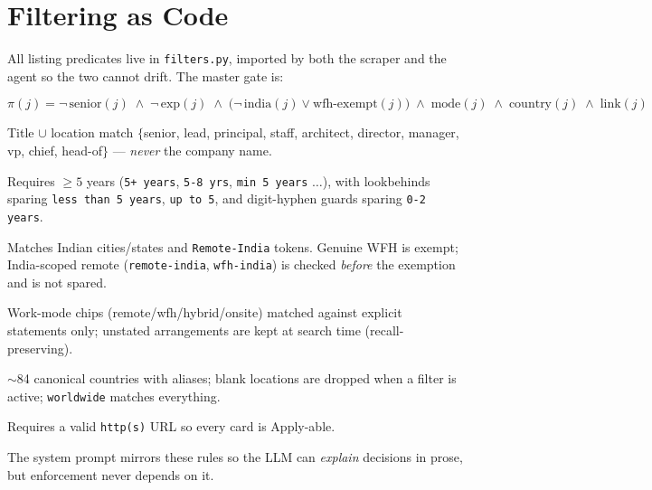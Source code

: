 \documentclass[11pt,a4paper]{article}
\newcommand{\file}[1]{\texttt{\small #1}}
\newcommand{\code}[1]{\texttt{#1}}
\begin{document}
\section{Filtering as Code}
\label{sec:filters}

All listing predicates live in \file{filters.py}, imported by both the
scraper and the agent so the two cannot drift. The master gate is:

\begin{equation}
\pi(j) = \neg\,\text{senior}(j) \;\wedge\;
         \neg\,\text{exp}(j) \;\wedge\;
         \bigl(\neg\,\text{india}(j) \vee \text{wfh-exempt}(j)\bigr)
         \;\wedge\;
         \text{mode}(j) \;\wedge\;
         \text{country}(j) \;\wedge\;
         \text{link}(j)
\end{equation}

\begin{description}[leftmargin=6.4em, style=nextline]
  \item[senior$(j)$] Title $\cup$ location match
        $\{$senior, lead, principal, staff, architect, director, manager,
        vp, chief, head-of$\}$ --- \emph{never} the company name.
  \item[exp$(j)$] Requires $\geq 5$ years
        (\code{5+ years}, \code{5-8 yrs}, \code{min 5 years} $\ldots$),
        with lookbehinds sparing \code{less than 5 years}, \code{up to 5},
        and digit-hyphen guards sparing \code{0-2 years}.
  \item[india$(j)$] Matches Indian cities/states and \code{Remote-India}
        tokens. Genuine WFH is exempt; India-scoped remote
        (\code{remote-india}, \code{wfh-india}) is checked \emph{before}
        the exemption and is not spared.
  \item[mode$(j)$] Work-mode chips (remote/wfh/hybrid/onsite) matched
        against explicit statements only; unstated arrangements are kept at
        search time (recall-preserving).
  \item[country$(j)$] $\sim$84 canonical countries with aliases; blank
        locations are dropped when a filter is active; \code{worldwide}
        matches everything.
  \item[link$(j)$] Requires a valid \code{http(s)} URL so every card is
        Apply-able.
\end{description}

The system prompt mirrors these rules so the LLM can \emph{explain}
decisions in prose, but enforcement never depends on it.
\end{document}
